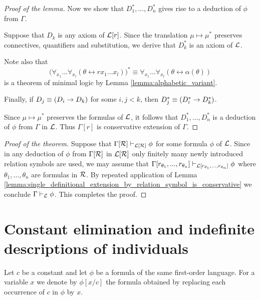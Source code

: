 \documentclass[10pt]{amsart}
\begin{document}
\begin{proof}[Proof of the lemma]
   Now we show that $D_1^*,...,D_n^*$ gives rise to a deduction of $\phi$ from $\Gamma$.

  Suppose that $D_k$ is any axiom of ${\mathcal L}[r]$. Since the translation $\mu \mapsto \mu^*$ preserves connectives, quantifiers and substitution, we derive that $D_k^*$ is an axiom of ${\mathcal L}$.

  Note also that
  $$\bigg(\forall_{x_1}...\forall_{x_{l}}\left(\theta \leftrightarrow rx_1...x_l\right)\bigg)^* \equiv \forall_{x_1}...\forall_{x_{l}}\left(\theta \leftrightarrow \alpha(\theta)\right)$$
    is a theorem of minimal logic by Lemma \ref{lemma:alphabetic_variant}.  

  Finally, if $D_j \equiv (D_i \rightarrow D_k)$ for some $i,j < k$, then $D_j^* \equiv (D_i^* \rightarrow D_k^*)$.

  Since $\mu \mapsto \mu^*$ preserves the formulas of ${\mathcal L}$, it follows that $D_1^*,...,D_n^*$ is a deduction of $\phi$ from $\Gamma$ in ${\mathcal L}$. Thus $\Gamma[r]$ is conservative extension of $\Gamma$.
\end{proof}

\begin{proof}[Proof of the theorem]
  Suppose that $\Gamma[{\mathcal R}] \vdash_{{\mathcal L}[{\mathcal R}]} \phi$ for some formula $\phi$ of ${\mathcal L}$. Since in any deduction of $\phi$ from $\Gamma[{\mathcal R}]$ in ${\mathcal L}[{\mathcal R}]$ only finitely many newly introduced relation symbols are used, we may assume that $\Gamma[r_{\theta_1},...,r_{\theta_n}] \vdash_{{\mathcal L}[r_{\theta_1},...,r_{\theta_n}]}\phi$ where $\theta_1,...,\theta_n$ are formulas in ${\mathcal R}$. By repeated application of Lemma \ref{lemma:single_definitional_extension_by_relation_symbol_is_conservative} we conclude $\Gamma \vdash_{{\mathcal L}}\phi$. This completes the proof.
\end{proof}

\section{Constant elimination and indefinite descriptions of individuals}
\noindent
Let $c$ be a constant and let $\phi$ be a formula of the same first-order language. For a variable $x$ we denote by $\phi[x/c]$ the formula obtained by replacing each occurrence of $c$ in $\phi$ by $x$.
\end{document}
